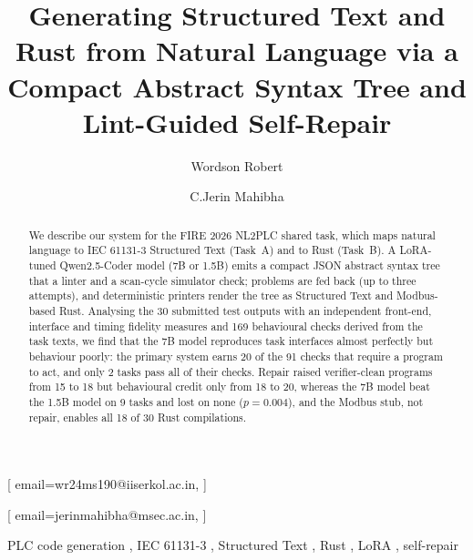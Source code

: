 \documentclass{ceurart}
\begin{document}


\title{Generating Structured Text and Rust from Natural Language via a Compact Abstract Syntax Tree and Lint-Guided Self-Repair}

\author[1]{Wordson Robert}[%
email=wr24ms190@iiserkol.ac.in,
]
\cormark[1]
\address[1]{Indian Institute of Science Education and Research, Kolkata}

\author[2]{C.Jerin Mahibha}[%
email=jerinmahibha@msec.ac.in,
]
\cormark[1]
\address[2]{Meenakshi Sundararajan Engineering College, Chennai}


\begin{abstract}
  We describe our system for the FIRE 2026 NL2PLC shared task, which maps natural language to IEC 61131-3 Structured Text (Task~A) and to Rust (Task~B). A LoRA-tuned Qwen2.5-Coder model (7B or 1.5B) emits a compact JSON abstract syntax tree that a linter and a scan-cycle simulator check; problems are fed back (up to three attempts), and deterministic printers render the tree as Structured Text and Modbus-based Rust. Analysing the 30 submitted test outputs with an independent front-end, interface and timing fidelity measures and 169 behavioural checks derived from the task texts, we find that the 7B model reproduces task interfaces almost perfectly but behaviour poorly: the primary system earns 20 of the 91 checks that require a program to act, and only 2 tasks pass all of their checks. Repair raised verifier-clean programs from 15 to 18 but behavioural credit only from 18 to 20, whereas the 7B model beat the 1.5B model on 9 tasks and lost on none ($p=0.004$), and the Modbus stub, not repair, enables all 18 of 30 Rust compilations.
\end{abstract}

\begin{keywords}
  PLC code generation \sep
  IEC 61131-3 \sep
  Structured Text \sep
  Rust \sep
  LoRA \sep
  self-repair
\end{keywords}

\maketitle
\end{document}
